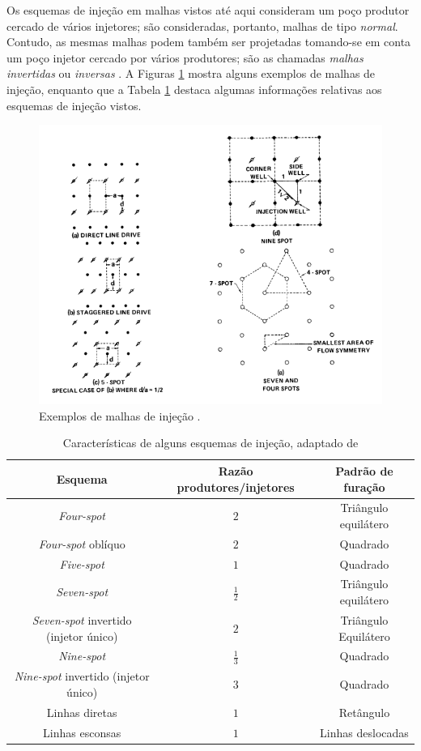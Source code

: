 Os esquemas de inje\c{c}\~{a}o em malhas vistos at\'{e} aqui consideram um po\c{c}o produtor cercado de v\'{a}rios injetores; s\~{a}o consideradas, portanto, malhas de tipo \textit{normal}. Contudo, as mesmas malhas podem tamb\'{e}m ser projetadas tomando-se em conta um po\c{c}o injetor cercado por v\'{a}rios produtores; s\~{a}o as chamadas \textit{malhas invertidas} ou \textit{inversas} \cite[p. 569]{engres}. A Figuras \ref{fig:rev_inj7i} mostra alguns exemplos de malhas de inje\c{c}\~{a}o, enquanto que a Tabela \ref{tab:wfdpat} destaca algumas informa\c{c}\~{o}es relativas aos esquemas de inje\c{c}\~{a}o vistos.

\begin{figure}[!ht]
\centering
\includegraphics[width=.7\textwidth]{figs/revisao/revisao_injmalhas.png}
\caption{Exemplos de malhas de inje\c{c}\~{a}o \cite{singh1982}.}
\label{fig:rev_inj7i}
\end{figure}

\begin{table}[!ht]
	\centering
	\caption{Caracter\'{i}sticas de alguns esquemas de inje\c{c}\~{a}o, adaptado de \cite{singh1982}\label{tab:wfdpat}}
	\begin{tabular}{|c|c|c|}
		\hline
		\textbf{Esquema} & \textbf{Raz\~{a}o produtores/injetores} & \textbf{Padr\~{a}o de fura\c{c}\~{a}o} \\ \hline
		\textit{Four-spot} & $2$ & Tri\^{a}ngulo equil\'{a}tero \\ \hline
		\textit{Four-spot} obl\'{i}quo & $2$ & Quadrado \\ \hline
		\textit{Five-spot} & $1$ & Quadrado \\ \hline
		\textit{Seven-spot} & $\frac{1}{2}$ & Tri\^{a}ngulo equil\'{a}tero \\ \hline
		\textit{Seven-spot} invertido (injetor \'{u}nico) & $2$ & Tri\^{a}ngulo Equil\'{a}tero \\ \hline
		\textit{Nine-spot} & $\frac{1}{3}$ & Quadrado \\ \hline
		\textit{Nine-spot} invertido (injetor \'{u}nico) & $3$ & Quadrado \\ \hline
		Linhas diretas & $1$ & Ret\^{a}ngulo \\ \hline
		Linhas esconsas & $1$ & Linhas deslocadas \\ \hline
		
	\end{tabular}
\end{table}

